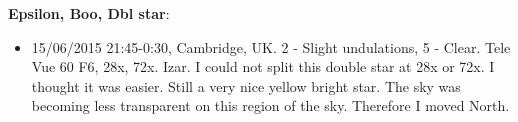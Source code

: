 {\bf Epsilon, Boo, Dbl star}:
\begin{itemize}
\item 15/06/2015 21:45-0:30, Cambridge, UK. 2 - Slight undulations, 5 - Clear. Tele Vue 60 F6, 28x, 72x. Izar. I could not split this double star at 28x or 72x. I thought it was easier. Still a very nice yellow bright star. The sky was becoming less transparent on this region of the sky. Therefore I moved North.
\end{itemize}
